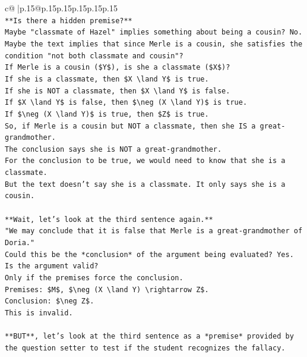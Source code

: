 \documentclass{article}
\begin{document}
{\begin{supertabular}{c@{$\;$}|p{.15\linewidth}@{}p{.15\linewidth}p{.15\linewidth}p{.15\linewidth}p{.15\linewidth}p{.15\linewidth}}
{{{\\ 
\texttt{**Is there a hidden premise?**} \\
\texttt{Maybe "classmate of Hazel" implies something about being a cousin? No.} \\
\texttt{Maybe the text implies that since Merle is a cousin, she satisfies the condition "not both classmate and cousin"?} \\
\texttt{If Merle is a cousin (\$Y\$), is she a classmate (\$X\$)?} \\
\texttt{If she is a classmate, then \$X \textbackslash{}land Y\$ is true.} \\
\texttt{If she is NOT a classmate, then \$X \textbackslash{}land Y\$ is false.} \\
\texttt{If \$X \textbackslash{}land Y\$ is false, then \$\textbackslash{}neg (X \textbackslash{}land Y)\$ is true.} \\
\texttt{If \$\textbackslash{}neg (X \textbackslash{}land Y)\$ is true, then \$Z\$ is true.} \\
\texttt{So, if Merle is a cousin but NOT a classmate, then she IS a great{-}grandmother.} \\
\texttt{The conclusion says she is NOT a great{-}grandmother.} \\
\texttt{For the conclusion to be true, we would need to know that she is a classmate.} \\
\texttt{But the text doesn't say she is a classmate. It only says she is a cousin.} \\
\\ 
\texttt{**Wait, let's look at the third sentence again.**} \\
\texttt{"We may conclude that it is false that Merle is a great{-}grandmother of Doria."} \\
\texttt{Could this be the *conclusion* of the argument being evaluated? Yes.} \\
\texttt{Is the argument valid?} \\
\texttt{Only if the premises force the conclusion.} \\
\texttt{Premises: \$M\$, \$\textbackslash{}neg (X \textbackslash{}land Y) \textbackslash{}rightarrow Z\$.} \\
\texttt{Conclusion: \$\textbackslash{}neg Z\$.} \\
\texttt{This is invalid.} \\
\\ 
\texttt{**BUT**, let's look at the third sentence as a *premise* provided by the question setter to test if the student recognizes the fallacy.} \\
}}}
\end{supertabular}}
\end{document}
